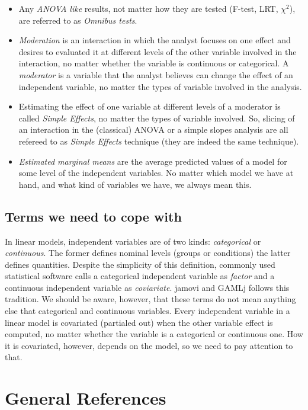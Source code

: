 \documentclass[
]{book}
\begin{document}
\begin{itemize}
\item
  Any \emph{ANOVA like} results, not matter how they are tested (F-test, LRT, \(\chi^2\)), are referred to as \emph{Omnibus tests}.
\item
  \emph{Moderation} is an interaction in which the analyst focuses on one effect and desires to evaluated it at different levels of the other variable involved in the interaction, no matter whether the variable is continuous or categorical. A \emph{moderator} is a variable that the analyst believes can change the effect of an independent variable, no matter the types of variable involved in the analysis.
\item
  Estimating the effect of one variable at different levels of a moderator is called \emph{Simple Effects}, no matter the types of variable involved. So, slicing of an interaction in the (classical) ANOVA or a simple slopes analysis are all refereed to as \emph{Simple Effects} technique (they are indeed the same technique).
\item
  \emph{Estimated marginal means} are the average predicted values of a model for some level of the independent variables. No matter which model we have at hand, and what kind of variables we have, we always mean this.
\end{itemize}

\hypertarget{covnames}{%
\subsection{Terms we need to cope with}\label{covnames}}

In linear models, independent variables are of two kinds: \emph{categorical} or \emph{continuous}. The former defines nominal levels (groups or conditions) the latter defines quantities. Despite the simplicity of this definition, commonly used statistical software calls a categorical independent variable as \emph{factor} and a continuous independent variable as \emph{coviariate}. {jamovi} and {GAMLj} follows this tradition. We should be aware, however, that these terms do not mean anything else that categorical and continuous variables. Every independent variable in a linear model is covariated (partialed out) when the other variable effect is computed, no matter whether the variable is a categorical or continuous one. How it is covariated, however, depends on the model, so we need to pay attention to that.

\hypertarget{general-references}{%
\section{General References}\label{general-references}}
\end{document}
